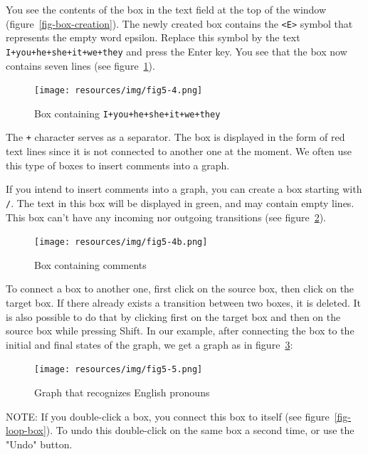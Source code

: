 \bigskip
\noindent You see the contents of the box in the text field at the top of the
window (figure~\ref{fig-box-creation}). The newly created box contains the \verb+<E>+ symbol that represents the empty word
epsilon. Replace this symbol by the text \verb$I+you+he+she+it+we+they$ and
press the Enter key. You see that the box now contains seven lines (see
figure~\ref{fig-pronoun-box}).

\begin{figure}[!ht]
\begin{center}
\texttt{[image: resources/img/fig5-4.png]}
\caption{Box containing
\texttt{I+you+he+she+it+we+they}\label{fig-pronoun-box}}
\end{center}
\end{figure}

\bigskip
\noindent The \verb$+$ character serves as a
separator.\index{\verbc{+}} The box is displayed in the form of red text lines since it is 
not connected to another one at the moment.
We often use this type of boxes to insert comments into a
graph. 

\bigskip
\noindent If you intend to insert comments into a graph, you can create a box starting with \verb$/$.
The text in this box will be displayed in green, and may contain empty lines.
This box can't have any incoming nor outgoing transitions (see
figure~\ref{comment-box}).

\begin{figure}[!ht]
\begin{center}
\texttt{[image: resources/img/fig5-4b.png]}
\caption{Box containing comments\label{comment-box}}
\end{center}
\end{figure}

\bigskip
\noindent To connect a box to another one, first click on the source box, then
click on the target box. If there
already exists a transition between two boxes, it is deleted. It is also possible
to do that by clicking first on the target box and then on the
source box while pressing Shift. In our example, after connecting the box to the initial
and final states of the graph, we get a graph as in
figure~\ref{fig-pronoun-graph}:

\begin{figure}[!ht]
\begin{center}
\texttt{[image: resources/img/fig5-5.png]}
\caption{Graph that recognizes English
pronouns\label{fig-pronoun-graph}}
\end{center}
\end{figure}
\bigskip
\noindent NOTE: If you double-click a box, you connect this box to itself (see
figure~\ref{fig-loop-box}). To undo this double-click on the
same box a second time, or use the "Undo" button.

